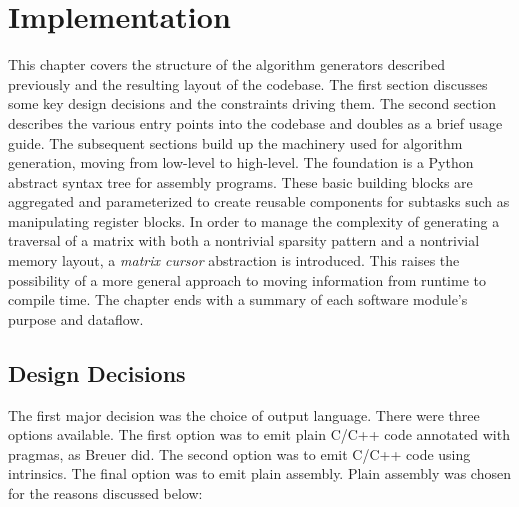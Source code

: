 
\chapter{Implementation}
\label{chapter:implementation}

This chapter covers the structure of the algorithm generators described previously and the resulting layout of the codebase. The first section discusses some key design decisions and the constraints driving them. The second section describes the various entry points into the codebase and doubles as a brief usage guide. The subsequent sections build up the machinery used for algorithm generation, moving from low-level to high-level. The foundation is a Python abstract syntax tree for assembly programs. These basic building blocks are aggregated and parameterized to create reusable components for subtasks such as manipulating register blocks. In order to manage the complexity of generating a traversal of a matrix with both a nontrivial sparsity pattern and a nontrivial memory layout, a \emph{matrix cursor} abstraction is introduced. This raises the possibility of a more general approach to moving information from runtime to compile time. The chapter ends with a summary of each software module's purpose and dataflow.

\section{Design Decisions}

The first major decision was the choice of output language. There were three options available. The first option was to emit plain C/C++ code annotated with pragmas, as Breuer did. The second option was to emit C/C++ code using intrinsics. The final option was to emit plain assembly. Plain assembly was chosen for the reasons discussed below:

